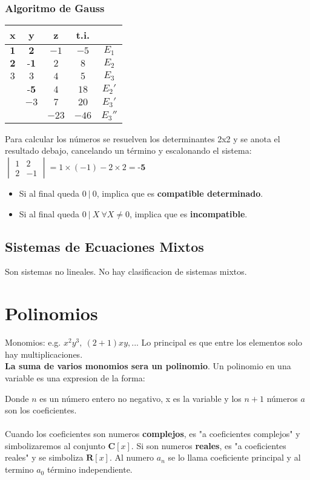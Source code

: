 \documentclass[10pt]{article}
\begin{document}
\subsubsection{Algoritmo de Gauss}
\begin{table}[h]
\begin{multicols}{2}
\begin{tabular}{ccc|cc}
x&y&z& t.i.&\\
\hline
$\textbf{1}$&$\textbf{2}$&$-1$&$-5$&$E_1$\\
$\textbf{2}$&$\textbf{-1}$&$2$&$8$&$E_2$\\
$3$&$3$&$4$&$5$&$E_3$\\
\hline
&$\textbf{-5}$&$4$&$18$&$E_2'$\\
&$-3$&$7$&$20$&$E_3'$\\
\hline
&&$-23$&$-46$&$E_3''$\\
\end{tabular}

Para calcular los números se resuelven los determinantes 2x2 y se anota el resultado debajo, cancelando un término y escalonando el sistema:\\
$\begin{vmatrix}
1&2\\
2&-1
\end{vmatrix} = 1 \times (-1) - 2 \times 2 = \textbf{-5}$
\end{multicols}
\end{table}
\begin{itemize}
\item Si al final queda $0\ |\ 0$, implica que es \textbf{compatible determinado}.
\item Si al final queda $0\ |\ X\ \forall X \not = 0$, implica que es \textbf{incompatible}.
\end{itemize}
\subsection{Sistemas de Ecuaciones Mixtos}
Son sistemas no lineales. No hay clasificacion de sistemas mixtos.

\newpage
\section{Polinomios}
Monomios: e.g. $x^2y^3,\ (2+1)xy,...$ Lo principal es que entre los elementos solo hay multiplicaciones.\\
\textbf{La suma de varios monomios sera un polinomio}. Un polinomio en una variable es una expresion de la forma:\
\begin{center}
\end{center}
Donde $n$ es un número entero no negativo, x es la variable y los $n+1$ números $a$ son los coeficientes.\\ \\ Cuando los coeficientes son numeros \textbf{complejos}, es "a coeficientes complejos" y simbolizaremos al conjunto $\textbf{C}[x]$. Si son numeros \textbf{reales}, es "a coeficientes reales" y se simboliza $\textbf{R}[x]$. Al numero $a_n$ se lo llama coeficiente principal y al termino $a_0$ término independiente.
\end{document}
